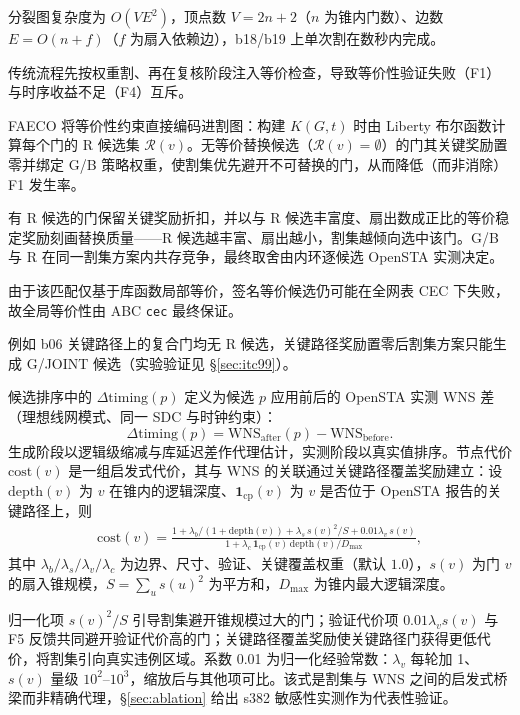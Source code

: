 \documentclass[journal]{IEEEtran}
\begin{document}
分裂图复杂度为 $O(VE^2)$，顶点数 $V=2n+2$（$n$ 为锥内门数）、边数 $E=O(n+f)$（$f$ 为扇入依赖边），b18/b19 上单次割在数秒内完成。

传统流程先按权重割、再在复核阶段注入等价检查，导致等价性验证失败（F1）与时序收益不足（F4）互斥。

FAECO 将等价性约束直接编码进割图：构建 $K(G, t)$ 时由 Liberty 布尔函数计算每个门的 R 候选集 $\mathcal{R}(v)$。无等价替换候选（$\mathcal{R}(v)=\emptyset$）的门其关键奖励置零并绑定 G/B 策略权重，使割集优先避开不可替换的门，从而降低（而非消除）F1 发生率。

有 R 候选的门保留关键奖励折扣，并以与 R 候选丰富度、扇出数成正比的等价稳定奖励刻画替换质量——R 候选越丰富、扇出越小，割集越倾向选中该门。G/B 与 R 在同一割集方案内共存竞争，最终取舍由内环逐候选 OpenSTA 实测决定。

由于该匹配仅基于库函数局部等价，签名等价候选仍可能在全网表 CEC 下失败，故全局等价性由 ABC \texttt{cec} 最终保证。

例如 b06 关键路径上的复合门均无 R 候选，关键路径奖励置零后割集方案只能生成 G/JOINT 候选（实验验证见 \S\ref{sec:itc99}）。

候选排序中的 $\Delta\mathrm{timing}(p)$ 定义为候选 $p$ 应用前后的 OpenSTA 实测 WNS 差（理想线网模式、同一 SDC 与时钟约束）：
\begin{equation}\label{eq:dtiming}
\Delta\mathrm{timing}(p) = \mathrm{WNS}_{\mathrm{after}}(p) - \mathrm{WNS}_{\mathrm{before}}.
\end{equation}
生成阶段以逻辑级缩减与库延迟差作代理估计，实测阶段以真实值排序。节点代价 $\mathrm{cost}(v)$ 是一组启发式代价，其与 WNS 的关联通过关键路径覆盖奖励建立：设 $\mathrm{depth}(v)$ 为 $v$ 在锥内的逻辑深度、$\mathbf{1}_{\mathrm{cp}}(v)$ 为 $v$ 是否位于 OpenSTA 报告的关键路径上，则
{\small
\begin{equation}
\label{eq:cost}
\begin{split}
\mathrm{cost}(v) = \frac{1 + \lambda_b/(1+\mathrm{depth}(v)) + \lambda_s\,s(v)^2/S + 0.01\lambda_v\,s(v)}{1 + \lambda_c\,\mathbf{1}_{\mathrm{cp}}(v)\,\mathrm{depth}(v)/D_{\max}},
\end{split}
\end{equation}
}
其中 $\lambda_b/\lambda_s/\lambda_v/\lambda_c$ 为边界、尺寸、验证、关键覆盖权重（默认 $1.0$），$s(v)$ 为门 $v$ 的扇入锥规模，$S=\sum_u s(u)^2$ 为平方和，$D_{\max}$ 为锥内最大逻辑深度。

归一化项 $s(v)^2/S$ 引导割集避开锥规模过大的门；验证代价项 $0.01\lambda_v s(v)$ 与 F5 反馈共同避开验证代价高的门；关键路径覆盖奖励使关键路径门获得更低代价，将割集引向真实违例区域。系数 0.01 为归一化经验常数：$\lambda_v$ 每轮加 1、$s(v)$ 量级 $10^2$--$10^3$，缩放后与其他项可比。该式是割集与 WNS 之间的启发式桥梁而非精确代理，\S\ref{sec:ablation} 给出 s382 敏感性实测作为代表性验证。
\end{document}
